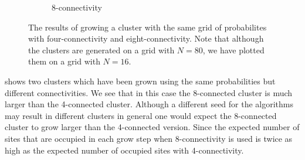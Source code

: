 \begin{figure}
\begin{subfigure}{0.45\columnwidth}
		\caption{8-connectivity}
		\label{fig:exp:connectivity:eightConnect}
	\end{subfigure}	
	\caption{The results of growing a cluster with the same grid of probabilites with  four-connectivity and  eight-connectivity. Note that although the clusters are generated on a grid with $N = 80$, we have plotted them on a grid with $N = 16$.}
	\label{fig:exp:connectivityResults}
\end{figure}

 shows two clusters which have been grown using the same probabilities but different connectivities. We see that in this case the 8-connected cluster is much larger than the 4-connected cluster. Although a different seed for the algorithms may result in different clusters in general one would expect the 8-connected cluster to grow larger than the 4-connected version. Since the expected number of sites that are occupied in each grow step when 8-connectivity is used is twice as high as the expected number of occupied sites with 4-connectivity. 

